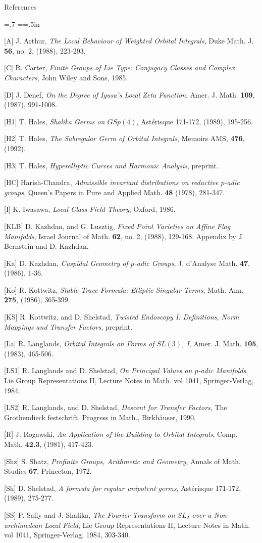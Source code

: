 \vfill\break
\centerline{\headfont References}
\bigskip
{
\parindent=0pt
\baselineskip=.7\baselineskip
\everypar={\hangindent=.5in}

[A]  J. Arthur, {\it The Local Behaviour of Weighted Orbital
Integrals}, Duke Math. J. {\bf 56}, no. 2, (1988), 223-293.

[C] R. Carter, {\it Finite Groups of Lie Type: Conjugacy Classes
and Complex Characters}, John Wiley and Sons, 1985.

[D]  J. Denef, {\it On the Degree of Igusa's Local Zeta Function},
   Amer. J. Math. {\bf 109},  (1987), 991-1008.

[H1]  T. Hales, {\it Shalika Germs on $GSp(4)$}, Ast\'erisque 171-172,
    (1989),  195-256.

[H2]  T. Hales, {\it The Subregular Germ of Orbital Integrals},
   Memoirs AMS, {\bf 476}, (1992).

[H3]  T. Hales, {\it Hyperelliptic Curves and Harmonic Analysis}, preprint.

[HC]  Harish-Chandra, {\it Admissible invariant distributions on reductive
  $p$-adic groups}, Queen's Papers in Pure and Applied Math. {\bf 48} (1978),
  281-347.

[I]  K. Iwasawa, {\it Local Class Field Theory}, Oxford, 1986.

[KLB]  D. Kazhdan, and G. Lusztig, {\it Fixed Point Varieties
on Affine Flag Manifolds}, Israel Journal of Math. {\bf 62},
no. 2, (1988), 129-168. Appendix by J. Bernstein and D. Kazhdan.

[Ka]  D. Kazhdan, {\it Cuspidal Geometry of $p$-adic Groups}, J.
d'Analyse Math. {\bf 47}, (1986), 1-36.

[Ko]  R. Kottwitz, {\it Stable Trace Formula: Elliptic Singular Terms},
   Math. Ann. {\bf 275}, (1986), 365-399.

[KS]  R. Kottwitz, and D. Shelstad, 
  {\it Twisted Endoscopy I: Definitions, Norm Mappings
	and Transfer Factors}, preprint.

[La] R. Langlands, {\it Orbital Integrals on Forms of $SL(3)$, I},
   Amer. J. Math. {\bf 105},  (1983), 465-506.

[LS1]  R. Langlands and  D. Shelstad, {\it On Principal Values on $p$-adic
  Manifolds}, Lie Group Representations II, Lecture Notes in Math. vol 1041,
  Springer-Verlag, 1984.

[LS2]  R. Langlands, and D.  Shelstad, {\it Descent for Transfer
Factors}, The Grothendieck festschrift, Progress in Math.,
Birkh\"auser, 1990.

[R]  J. Rogawski, {\it An Application of the Building to
Orbital Integrals}, Comp. Math. {\bf 42.3}, (1981), 417-423.

[Shz] S. Shatz, {\it Profinite Groups, Arithmetic and Geometry},
Annals of Math. Studies  {\bf 67}, Princeton, 1972.

[Sh]  D. Shelstad, {\it A formula for regular unipotent germs},
Ast\'erisque 171-172, (1989), 275-277.

[SS] P. Sally and J. Shalika, {\it The Fourier Transform on $SL_2$ over
 a Non-archimedean Local Field}, Lie Group Representations II,
Lecture Notes in Math. vol 1041, Springer-Verlag, 1984, 303-340.

}
\bye
